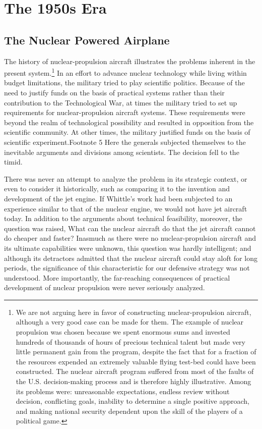 \section{The 1950s Era}
\subsection{The Nuclear Powered Airplane}
The history of nuclear-propulsion aircraft illustrates the problems inherent in the present system.\footnote{
We are not arguing here in favor of constructing nuclear-propulsion aircraft, although a very good case can be made for them. The example of nuclear propulsion was chosen because we spent enormous sums and invested hundreds of thousands of hours of precious technical talent but made very little permanent gain from the program, despite the fact that for a fraction of the resources expended an extremely valuable flying test-bed could have been constructed. The nuclear aircraft program suffered from most of the faults of the U.S. decision-making process and is therefore highly illustrative. Among its problems were: unreasonable expectations, endless review without decision, conflicting goals, inability to determine a single positive approach, and making national security dependent upon the skill of the players of a political game.
} In an effort to advance nuclear technology while living within budget limitations, the military tried to play scientific politics. Because of the need to justify funds on the basis of practical systems rather than their contribution to the Technological War, at times the military tried to set up requirements for nuclear-propulsion aircraft systems. These requirements were beyond the realm of technological possibility and resulted in opposition from the scientific community. At other times, the military justified funds on the basis of scientific experiment.Footnote 5 Here the generals subjected themselves to the inevitable arguments and divisions among scientists. The decision fell to the timid.

There was never an attempt to analyze the problem in its strategic context, or even to consider it historically, such as comparing it to the invention and development of the jet engine. If Whittle's work had been subjected to an experience similar to that of the nuclear engine, we would not have jet aircraft today. In addition to the arguments about technical feasibility, moreover, the question was raised, What can the nuclear aircraft do that the jet aircraft cannot do cheaper and faster? Inasmuch as there were no nuclear-propulsion aircraft and its ultimate capabilities were unknown, this question was hardly intelligent; and although its detractors admitted that the nuclear aircraft could stay aloft for long periods, the significance of this characteristic for our defensive strategy was not understood. More importantly, the far-reaching consequences of practical development of nuclear propulsion were never seriously analyzed.

